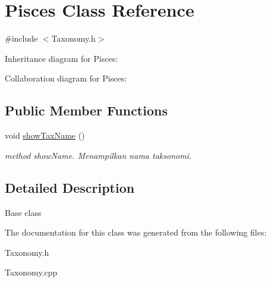 \hypertarget{classPisces}{}\section{Pisces Class Reference}
\label{classPisces}


{\ttfamily \#include $<$Taxonomy.\+h$>$}



Inheritance diagram for Pisces\+:


Collaboration diagram for Pisces\+:
\subsection*{Public Member Functions}
\begin{DoxyCompactItemize}
\item 
void \hyperlink{classPisces_a7173ad0c2d6735f3de8c3e1d931c5c41}{show\+Tax\+Name} ()\hypertarget{classPisces_a7173ad0c2d6735f3de8c3e1d931c5c41}{}\label{classPisces_a7173ad0c2d6735f3de8c3e1d931c5c41}

\begin{DoxyCompactList}\small\item\em method show\+Name. Menampilkan nama taksonomi. \end{DoxyCompactList}\end{DoxyCompactItemize}


\subsection{Detailed Description}
Base class 

The documentation for this class was generated from the following files\+:\begin{DoxyCompactItemize}
\item 
Taxonomy.\+h\item 
Taxonomy.\+cpp\end{DoxyCompactItemize}
